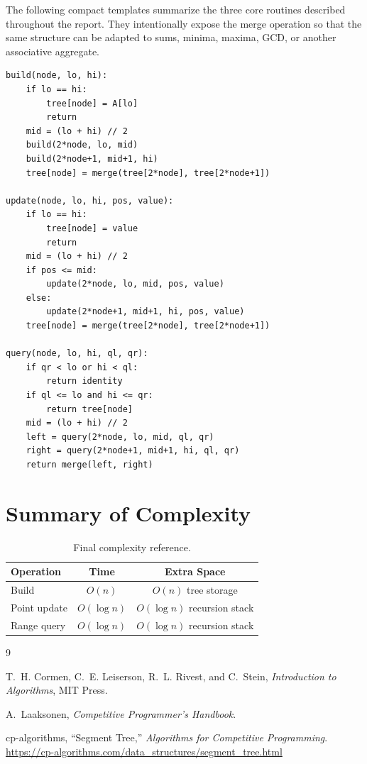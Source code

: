 \documentclass[11pt,open=any,headings=option]{scrreprt}
\begin{document}
The following compact templates summarize the three core routines described throughout the report. They intentionally expose the merge operation so that the same structure can be adapted to sums, minima, maxima, GCD, or another associative aggregate.

\begin{lstlisting}
build(node, lo, hi):
    if lo == hi:
        tree[node] = A[lo]
        return
    mid = (lo + hi) // 2
    build(2*node, lo, mid)
    build(2*node+1, mid+1, hi)
    tree[node] = merge(tree[2*node], tree[2*node+1])

update(node, lo, hi, pos, value):
    if lo == hi:
        tree[node] = value
        return
    mid = (lo + hi) // 2
    if pos <= mid:
        update(2*node, lo, mid, pos, value)
    else:
        update(2*node+1, mid+1, hi, pos, value)
    tree[node] = merge(tree[2*node], tree[2*node+1])

query(node, lo, hi, ql, qr):
    if qr < lo or hi < ql:
        return identity
    if ql <= lo and hi <= qr:
        return tree[node]
    mid = (lo + hi) // 2
    left = query(2*node, lo, mid, ql, qr)
    right = query(2*node+1, mid+1, hi, ql, qr)
    return merge(left, right)
\end{lstlisting}

\chapter{Summary of Complexity}
\begin{table}[H]
\centering
\caption{Final complexity reference.}
\begin{tabular}{lcc}
\toprule
\textbf{Operation} & \textbf{Time} & \textbf{Extra Space}\\
\midrule
Build & $O(n)$ & $O(n)$ tree storage\\
Point update & $O(\log n)$ & $O(\log n)$ recursion stack\\
Range query & $O(\log n)$ & $O(\log n)$ recursion stack\\
\bottomrule
\end{tabular}
\end{table}

\begin{thebibliography}{9}

T.~H. Cormen, C.~E. Leiserson, R.~L. Rivest, and C.~Stein, \textit{Introduction to Algorithms}, MIT Press.

A.~Laaksonen, \textit{Competitive Programmer's Handbook}.

cp-algorithms, ``Segment Tree,'' \textit{Algorithms for Competitive Programming}. \url{https://cp-algorithms.com/data_structures/segment_tree.html}

\end{thebibliography}
\end{document}
